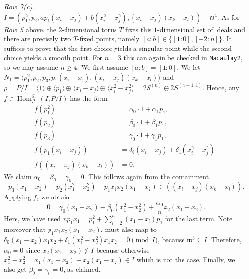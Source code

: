 \documentclass[11pt]{amsart}
\theoremstyle{definition}
\newcommand{\mm}{\mathfrak{m}}
\DeclareMathOperator{\Hom}{Hom}
\begin{document}
\medskip
\emph{Row~7(c).} $I = (p_1^2,p_2,ap_1(x_i-x_j)+b(x_i^2-x_j^2),(x_i-x_j)(x_k-x_l)) + \mm^3$. As for \emph{Row~5} above, the $2$-dimensional torus $T$ fixes this $1$-dimensional set of ideals and there are precisely two $T$-fixed points, namely $[a:b] \in \{[1:0],[-2:n]\}$. It suffices to prove that the first choice yields a singular point while the second choice yields a smooth point. For $n=3$ this can again be checked in \texttt{Macaulay2}, so we may assume $n \geq 4$.
We first assume $[a:b] = [1:0]$. We let $N_1 = \langle p_1^2, p_2, p_3, p_1(x_i-x_j), (x_i-x_j)(x_k-x_l) \rangle$ and $\rho = P/I = \langle 1 \rangle \oplus \langle p_1 \rangle \oplus \langle x_i - x_j \rangle \oplus \langle x_i^2 - x_j^2 \rangle = 2S^{(n)} \oplus 2S^{(n-1,1)}$.
Hence, any $f \in \Hom^{S_n}_{P}(I,P/I)$ has the form
\begin{align*}
    f(p_1^2) &= \alpha_0 \cdot 1 + \alpha_1 p_1, \\
    f(p_2) &= \beta_0 \cdot 1 + \beta_1 p_1, \\
    f(p_3) &= \gamma_0 \cdot 1 + \gamma_1 p_1, \\
    f(p_1(x_i-x_j)) &= \delta_0 (x_i-x_j) + \delta_1 (x_i^2-x_j^2), \\
    f((x_i-x_j)(x_k-x_l)) &= 0.
\end{align*}
We claim $\alpha_0 = \beta_0 = \gamma_0 = 0$. This follows again from the containment
\begin{equation*}
    p_3(x_1-x_2) - p_2(x_1^2-x_2^2) + p_1 x_1 x_2 (x_1-x_2) \in ((x_i-x_j)(x_k-x_l)).
\end{equation*}
Applying $f$, we obtain
\begin{equation*}
    0 = \gamma_0 (x_1 - x_2) - \beta_0 (x_1^2 - x_2^2) + \frac{\alpha_0}{n} x_2(x_1-x_2).
\end{equation*}
Here, we have used $n p_1 x_1 = p_1^2 + \sum_{i=2}^n (x_1 - x_i) p_1$ for the last term. Note moreover that $p_1 x_1 x_2 (x_1-x_2).$ must also map to $\delta_0 (x_1-x_2)x_1x_2 + \delta_1 (x_1^2-x_2^2)x_1x_2 = 0 \pmod I$, because $\mm^3 \subseteq I$. Therefore, $\alpha_0 = 0$ since $x_2(x_1-x_2) \not\in I$ because otherwise $x_1^2 - x_2^2 = x_1(x_1-x_2) + x_2(x_1-x_2) \in I$ which is not the case. Finally, we also get $\beta_0 = \gamma_0 = 0$, as claimed. 
\end{document}
